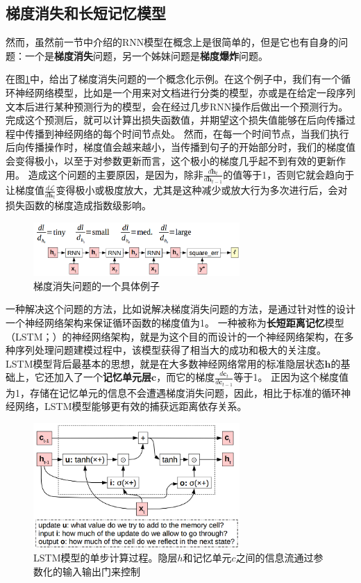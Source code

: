 \documentclass[10pt,a4paper]{ctexart}
\begin{document}
\subsection{梯度消失和长短记忆模型}
然而，虽然前一节中介绍的RNN模型在概念上是很简单的，但是它也有自身的问题：一个是\textbf{梯度消失}问题，另一个姊妹问题是\textbf{梯度爆炸}问题。

在图\ref{fig:16}中，给出了梯度消失问题的一个概念化示例。在这个例子中，我们有一个循环神经网络模型，比如是一个用来对文档进行分类的模型，亦或是在给定一段序列文本后进行某种预测行为的模型，会在经过几步RNN操作后做出一个预测行为。
完成这个预测后，就可以计算出损失函数值，并期望这个损失值能够在后向传播过程中传播到神经网络的每个时间节点处。
然而，在每一个时间节点，当我们执行后向传播操作时，梯度值会越来越小，当传播到句子的开始部分时，我们的梯度值会变得极小，以至于对参数更新而言，这个极小的梯度几乎起不到有效的更新作用。
造成这个问题的主要原因，是因为，除非$\frac{d\textbf{h}_{t}}{d\textbf{h}_{t-1}}$的值等于1，否则它就会趋向于让梯度值$\frac{d\mathcal{L}}{d\textbf{h}_t}$变得极小或极度放大，尤其是这种减少或放大行为多次进行后，会对损失函数的梯度造成指数级影响。

\begin{figure}[H]
\centering
\includegraphics[width=0.7\textwidth]{fig16.png}
\caption{梯度消失问题的一个具体例子}
\label{fig:16}
\end{figure}

一种解决这个问题的方法，比如说解决梯度消失问题的方法，是通过针对性的设计一个神经网络架构来保证循环函数的梯度值为1。
一种被称为\textbf{长短距离记忆}模型（LSTM；\cite{hochreiter1997long}）的神经网络架构，就是为这个目的而设计的一个神经网络架构，在多种序列处理问题建模过程中，该模型获得了相当大的成功和极大的关注度。
LSTM模型背后最基本的思想，就是在大多数神经网络常用的标准隐层状态$\textbf{h}$的基础上，它还加入了一个\textbf{记忆单元层}$\textbf{c}$，而它的梯度$\frac{d\textbf{c}_t}{d\textbf{c}_{t-1}}$等于1。
正因为这个梯度值为1，存储在记忆单元的信息不会遭遇梯度消失问题，因此，相比于标准的循环神经网络，LSTM模型能够更有效的捕获远距离依存关系。

\begin{figure}[H]
\centering
\includegraphics[width=0.7\textwidth]{fig17.png}
\caption{LSTM模型的单步计算过程。隐层\textbf{$h$}和记忆单元\textbf{$c$}之间的信息流通过参数化的输入输出门来控制}
\label{fig:17}
\end{figure}
\end{document}
